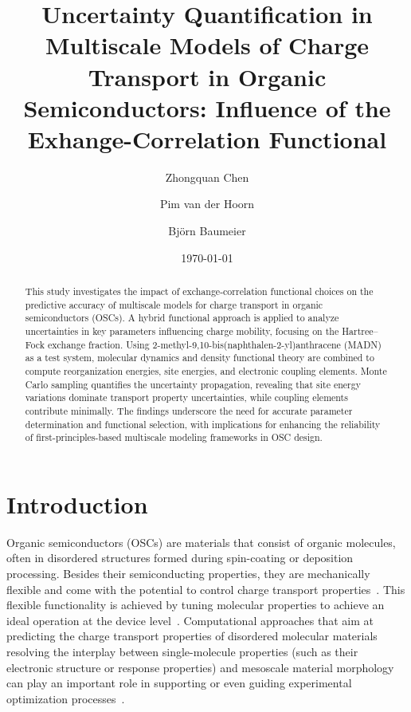 \documentclass[%
 reprint,
superscriptaddress,
 amsmath,amssymb,
 aps,
prb,
floatfix
]{revtex4-2}
\begin{document}
\title{Uncertainty Quantification in Multiscale Models of Charge Transport in Organic Semiconductors: Influence of the Exhange-Correlation Functional}

\author{Zhongquan Chen}
\author{Pim van der Hoorn}
\author{Bj\"orn Baumeier}

\date{\today}

\begin{abstract}
This study investigates the impact of exchange-correlation functional choices on the predictive accuracy of multiscale models for charge transport in organic semiconductors (OSCs). A hybrid functional approach is applied to analyze uncertainties in key parameters influencing charge mobility, focusing on the Hartree--Fock exchange fraction. Using 2-methyl-9,10-bis(naphthalen-2-yl)anthracene (MADN) as a test system, molecular dynamics and density functional theory are combined to compute reorganization energies, site energies, and electronic coupling elements. Monte Carlo sampling quantifies the uncertainty propagation, revealing that site energy variations dominate transport property uncertainties, while coupling elements contribute minimally. The findings underscore the need for accurate parameter determination and functional selection, with implications for enhancing the reliability of first-principles-based multiscale modeling frameworks in OSC design.  
\end{abstract}


\maketitle

\section{Introduction}
Organic semiconductors (OSCs) are materials that consist of organic molecules, often in disordered structures formed during spin-coating or deposition processing. Besides their semiconducting properties, they are mechanically flexible and come with the potential to control charge transport properties~\cite{hamers_flexible_2001,liu_high_2015,chow_organic_2020}. This flexible functionality is achieved by tuning molecular properties to achieve an ideal operation at the device level~\cite{bronstein_role_2020, bredas_organic_2002}. Computational approaches that aim at predicting the charge transport properties of disordered molecular materials resolving the interplay between single-molecule properties (such as their electronic structure or response properties) and mesoscale material morphology can play an important role in supporting or even guiding experimental optimization processes~\cite{bronstein_role_2020, sokolov_computational_2011, grynova_read_2018}.
\end{document}
